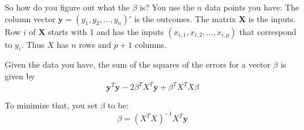 \documentclass[12pt]{article}
\begin{document}
So how do you figure out what the $\beta$ is? You use the $n$ data points you have: The column vector $\boldsymbol{y} = (y_1, y_2, \ldots, y_n)'$ is the outcomes. The matrix $\boldsymbol{X}$ is the inputs.  Row $i$ of $\boldsymbol{X}$ starts with 1 and has the inputs $(x_{i,1}, x_{i,2},\ldots,x_{i, p})$ that correspond to $y_i$. Thus $X$ has $n$ rows and $p+1$ columns.

Given the data you have, the sum of the squares of the errors for a vector $\beta$ is given by 
\begin{equation*}
\boldsymbol{y}^T \boldsymbol{y} - 2 \beta^T X^T \boldsymbol{y} + \beta^T X^T X \beta
\end{equation*}

To minimize that, you set $\beta$ to be:
\begin{equation*}
\beta = \left( X^T X \right)^{-1} X^T \boldsymbol{y}
\end{equation*}
\end{document}
